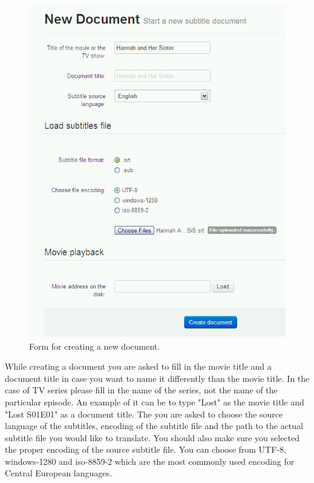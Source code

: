 \begin{figure}[h]
\begin{center}
\includegraphics[scale=0.4]{figures/user_manual/new_document.png}
\end{center}
\caption{Form for creating a new document.}
\end{figure}

While creating a document you are asked to fill in the movie title and a document title in case you want to name it differently than the movie title. In the case of TV series please fill in the name of the series, not the name of the particular episode. An example of it can be to type "Lost" as the movie title and "Lost S01E01" as a document title. The you are asked to choose the source language of the subtitles, encoding of the subtitle file and the path to the actual subtitle file you would like to translate. You should also make sure you selected the proper encoding of the source subtitle file. You can choose from UTF-8, windows-1280 and iso-8859-2 which are the most commonly used encoding for Central European languages.

